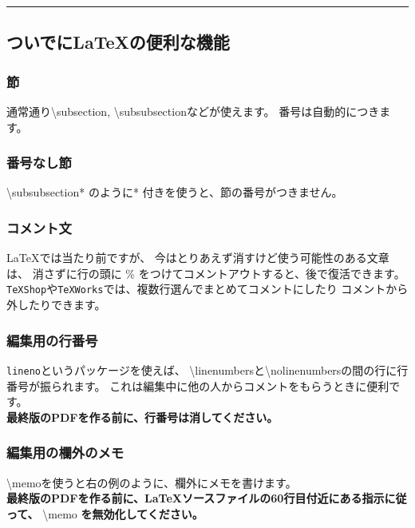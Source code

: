 \documentclass[11pt,a4j,dvipdfmx]{jarticle} 					%
\newcommand{\研究課題名}{象の卵}
\newcommand{\研究機関名}{逢坂大学}
\newcommand{\研究代表者氏名}{湯川秀樹}
\newcommand{\研究期間の最終元号年度}{8}  %
\newcommand{\memo}[1]{\marginpar{#1}}
\begin{document}
        \noindent
        \rule{\linewidth}{1pt}
        \linenumbers
        \subsection{ついでに\LaTeX の便利な機能}
        \subsubsection{節}
        通常通り\textbackslash subsection, \textbackslash subsubsectionなどが使えます。
        番号は自動的につきます。
        
        \subsubsection*{番号なし節}
        \textbackslash subsubsection* のように* 付きを使うと、節の番号がつきません。
        
        \subsubsection{コメント文}
        \LaTeX では当たり前ですが、
        今はとりあえず消すけど使う可能性のある文章は、
        消さずに行の頭に \% をつけてコメントアウトすると、後で復活できます。
        \texttt{TeXShop}や\texttt{TeXWorks}では、複数行選んでまとめてコメントにしたり
        コメントから外したりできます。
        
        \subsubsection{編集用の行番号}
        \texttt{lineno}というパッケージを使えば、
        \textbackslash linenumbersと\textbackslash nolinenumbersの間の行に行番号が振られます。
        これは編集中に他の人からコメントをもらうときに便利です。\\
        \textbf{最終版のPDFを作る前に、行番号は消してください。}
        
        \subsubsection{編集用の欄外のメモ}
        \textbackslash memo{}を使うと右の例のように、欄外にメモを書けます。\\
        \memo{欄外メモ\\だよ}
        \textbf{最終版のPDFを作る前に、\LaTeX ソースファイルの60行目付近にある指示に従って、}
        \textbackslash memo \textbf{を無効化してください。}
        
\end{document}
